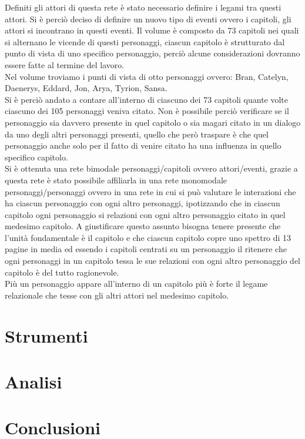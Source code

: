 \documentclass[a4paper]{article}
\begin{document}
Definiti gli attori di questa rete è stato necessario definire i legami tra questi attori. Si è perciò deciso di definire un nuovo tipo di eventi ovvero i capitoli, gli attori si incontrano in questi eventi. Il volume è composto da 73 capitoli nei quali si alternano le vicende di questi personaggi, ciascun capitolo è strutturato dal punto di vista di uno specifico personaggio, perciò alcune considerazioni dovranno essere fatte al termine del lavoro.\\
Nel volume troviamo i punti di vista di otto personaggi ovvero: Bran, Catelyn, Daenerys, Eddard, Jon, Arya, Tyrion, Sansa.\\
Si è perciò andato a contare all'interno di ciascuno dei 73 capitoli quante volte ciascuno dei 105 personaggi veniva citato. Non è possibile perciò verificare se il personaggio sia davvero presente in quel capitolo o sia magari citato in un dialogo da uno degli altri personaggi presenti, quello che però traspare è che quel personaggio anche solo per il fatto di venire citato ha una influenza in quello specifico capitolo.\\
Si è ottenuta una rete bimodale personaggi/capitoli ovvero attori/eventi, grazie a questa rete è stato possibile affiliarla in una rete monomodale personaggi/personaggi ovvero in una rete in cui si può valutare le interazioni che ha ciascun personaggio con ogni altro personaggi, ipotizzando che in ciascun capitolo ogni personaggio si relazioni con ogni altro personaggio citato in quel medesimo capitolo. A giustificare questo assunto bisogna tenere presente che l'unità fondamentale è il capitolo e che ciascun capitolo copre uno spettro di 13 pagine in media ed essendo i capitoli centrati su un personaggio il ritenere che ogni personaggi in un capitolo tessa le sue relazioni con ogni altro personaggio del capitolo è del tutto ragionevole.\\ 
Più un personaggio appare all'interno di un capitolo più è forte il legame relazionale che tesse con gli altri attori nel medesimo capitolo.


\section{Strumenti}

\section{Analisi}

\section{Conclusioni}
\end{document}

